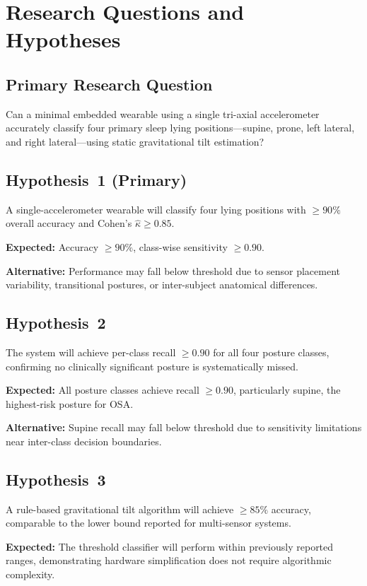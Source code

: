 \documentclass[journal]{IEEEtran}
\begin{document}
\section{Research Questions and Hypotheses}

\subsection{Primary Research Question}
Can a minimal embedded wearable using a single tri-axial accelerometer
accurately classify four primary sleep lying positions---supine, prone, left
lateral, and right lateral---using static gravitational tilt estimation?

\subsection{Hypothesis~1 (Primary)}
A single-accelerometer wearable will classify four lying positions with
$\geq90\%$ overall accuracy and Cohen's $\hat{\kappa}\geq0.85$.

\textbf{Expected:} Accuracy $\geq90\%$, class-wise sensitivity $\geq0.90$.

\textbf{Alternative:} Performance may fall below threshold due to sensor
placement variability, transitional postures, or inter-subject anatomical
differences.

\subsection{Hypothesis~2}
The system will achieve per-class recall $\geq0.90$ for all four posture
classes, confirming no clinically significant posture is systematically
missed.

\textbf{Expected:} All posture classes achieve recall $\geq0.90$,
particularly supine, the highest-risk posture for OSA.

\textbf{Alternative:} Supine recall may fall below threshold due to
sensitivity limitations near inter-class decision boundaries.

\subsection{Hypothesis~3}
A rule-based gravitational tilt algorithm will achieve $\geq85\%$ accuracy,
comparable to the lower bound reported for multi-sensor systems.

\textbf{Expected:} The threshold classifier will perform within previously
reported ranges, demonstrating hardware simplification does not require
algorithmic complexity.
\end{document}

